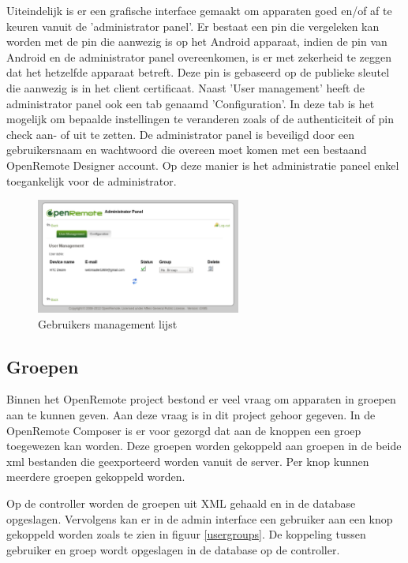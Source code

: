 \documentclass[]{article}
\begin{document}
Uiteindelijk is er een grafische interface gemaakt om apparaten goed en/of af te
keuren vanuit de 'administrator panel'. Er bestaat een pin die vergeleken kan
worden met de pin die aanwezig is op het Android apparaat, indien de pin van
Android en de administrator panel overeenkomen, is er met zekerheid te zeggen
dat het hetzelfde apparaat betreft. Deze pin is gebaseerd op de publieke
sleutel die aanwezig is in het client certificaat. Naast 'User management' heeft de
administrator panel ook een tab genaamd 'Configuration'. In deze tab is het
mogelijk om bepaalde instellingen te veranderen zoals of de authenticiteit of
pin check aan- of uit te zetten.  De administrator panel is beveiligd door een
gebruikersnaam en wachtwoord die overeen moet komen met een bestaand OpenRemote
Designer account. Op deze manier is het administratie paneel enkel toegankelijk
voor de administrator.

\begin{figure}[htpb]
   \begin{center}
     \includegraphics[width=0.6\textwidth]{userlist.pdf}
   \end{center}
   \label{userlist}
   \caption{Gebruikers management lijst}
\end{figure}

\subsection{Groepen}
Binnen het OpenRemote project bestond er veel vraag om apparaten in groepen aan
te kunnen geven. Aan deze vraag is in dit project gehoor gegeven. In de
OpenRemote Composer is er voor gezorgd dat aan de knoppen een groep toegewezen
kan worden. Deze groepen worden gekoppeld aan groepen in de beide xml bestanden
die geexporteerd worden vanuit de server. Per knop kunnen meerdere groepen
gekoppeld worden.

Op de controller worden de groepen uit XML gehaald en in de database opgeslagen.
Vervolgens kan er in de admin interface een gebruiker aan een knop gekoppeld
worden zoals te zien in figuur \ref{usergroups}. De koppeling tussen gebruiker
en groep wordt opgeslagen in de database op de controller. 
\end{document}
